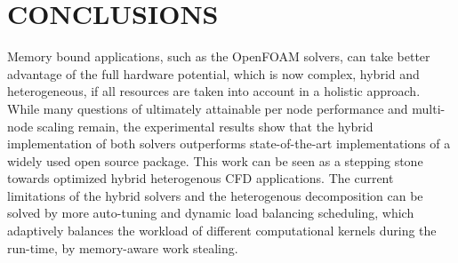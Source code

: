 \documentclass[3p,times]{elsarticle}
\begin{document}
       
\section{CONCLUSIONS}
Memory bound applications, such as the OpenFOAM solvers, can take better advantage of the full hardware potential, which is now complex, hybrid and heterogeneous, if all resources are taken into account in a holistic approach. While many questions of ultimately attainable per node performance and multi-node scaling remain, the experimental results show that the hybrid implementation of both solvers outperforms state-of-the-art implementations of a widely used open source package. This work can be seen as a stepping stone towards optimized hybrid heterogenous CFD applications. The current limitations of the hybrid solvers and the heterogenous decomposition can be solved by more auto-tuning and dynamic load balancing scheduling, which adaptively balances the workload of different computational kernels during the run-time, by memory-aware work stealing.













\end{document}
